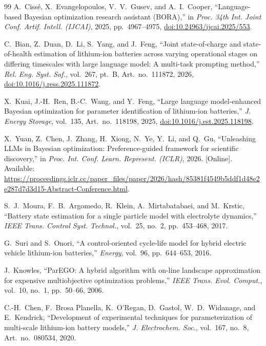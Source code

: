 \documentclass[lettersize,journal]{IEEEtran}
\begin{document}
\begin{thebibliography}{99}
A.~Ciss\'e, X.~Evangelopoulos, V.~V.~Gusev,
and A.~I.~Cooper,
``Language-based Bayesian optimization research assistant (BORA),''
in \textit{Proc. 34th Int. Joint Conf. Artif. Intell. (IJCAI)},
2025, pp.~4967--4975,
\href{https://doi.org/10.24963/ijcai.2025/553}
{doi:10.24963/ijcai.2025/553}.

C.~Bian, Z.~Duan, D.~Li, S.~Yang, and J.~Feng,
``Joint state-of-charge and state-of-health estimation of lithium-ion
batteries across varying operational stages on differing timescales with
large language model: A multi-task prompting method,''
\textit{Rel. Eng. Syst. Saf.}, vol.~267, pt.~B, Art.~no.~111872, 2026,
\href{https://doi.org/10.1016/j.ress.2025.111872}
{doi:10.1016/j.ress.2025.111872}.

X.~Kuai, J.-H.~Ren, B.-C.~Wang, and Y.~Feng,
``Large language model-enhanced Bayesian optimization for
parameter identification of lithium-ion batteries,''
\textit{J. Energy Storage},
vol.~135, Art.~no.~118198, 2025,
\href{https://doi.org/10.1016/j.est.2025.118198}
{doi:10.1016/j.est.2025.118198}.

X.~Yuan, Z.~Chen, J.~Zhang, H.~Xiong,
N.~Ye, Y.~Li, and Q.~Gu,
``Unleashing LLMs in Bayesian optimization:
Preference-guided framework for scientific discovery,''
in \textit{Proc. Int. Conf. Learn. Represent. (ICLR)}, 2026.
[Online]. Available:
\url{https://proceedings.iclr.cc/paper_files/paper/2026/hash/85381f4549b5ddf1d48e2e287d7d3d15-Abstract-Conference.html}.

S.~J.~Moura, F.~B.~Argomedo, R.~Klein,
A.~Mirtabatabaei, and M.~Krstic,
``Battery state estimation for a single particle model
with electrolyte dynamics,''
\textit{IEEE Trans. Control Syst. Technol.},
vol.~25, no.~2, pp.~453--468, 2017.

G.~Suri and S.~Onori,
``A control-oriented cycle-life model for hybrid electric
vehicle lithium-ion batteries,''
\textit{Energy}, vol.~96, pp.~644--653, 2016.

J.~Knowles,
``ParEGO: A hybrid algorithm with on-line landscape approximation
for expensive multiobjective optimization problems,''
\textit{IEEE Trans. Evol. Comput.},
vol.~10, no.~1, pp.~50--66, 2006.

C.-H.~Chen, F.~Brosa Planella, K.~O'Regan, D.~Gastol,
W.~D.~Widanage, and E.~Kendrick,
``Development of experimental techniques for parameterization
of multi-scale lithium-ion battery models,''
\textit{J. Electrochem. Soc.},
vol.~167, no.~8, Art.~no.~080534, 2020.


\end{thebibliography}
\end{document}
